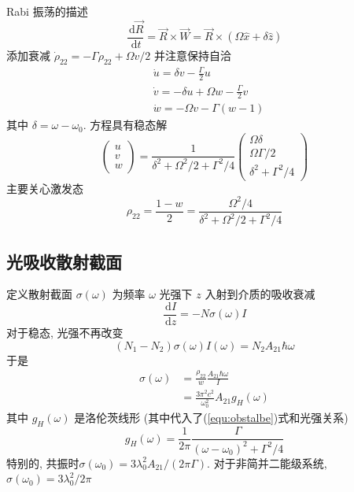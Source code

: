 \documentclass[10pt,a4paper,twocolumn]{article} %
\numberwithin{equation}{section} %
\newcommand{\dif}{\,\mathrm d}
\begin{document}
Rabi 振荡的描述
\begin{equation}
	\frac{\dif\vec R}{\dif t} = \vec R\times\vec W = \vec R\times
	(\Omega\hat x + \delta\hat z)
\end{equation}
添加衰减 $\dot\rho_{22} = -\Gamma\rho_{22} + \Omega v/2$ 并注意保持自洽
\begin{align}
	&\dot u = \delta v - \frac{\Gamma}{2}u \\
	&\dot v = -\delta u + \Omega w - \frac{\Gamma}{2}v \\
	&\dot w = -\Omega v - \Gamma(w - 1)
\end{align}
其中 $\delta = \omega - \omega_0$. 方程具有稳态解
\begin{equation}
	\begin{pmatrix}
		u \\ v \\ w
	\end{pmatrix} = \frac{1}{\delta^2+\Omega^2/2+\Gamma^2/4}
	\begin{pmatrix}
		\Omega\delta \\ \Omega\Gamma/2 \\ \delta^2 + \Gamma^2/4
	\end{pmatrix}
\end{equation}
主要关心激发态
\begin{equation}\label{equ:obstalbe}
	\rho_{22} = \frac{1-w}2 
	= \frac{\Omega^2/4}{\delta^2 + \Omega^2/2 + \Gamma^2/4}
\end{equation}
\subsection{光吸收散射截面} %
\label{sub:optical_abosrption_cross_section}
定义散射截面 $\sigma(\omega)$ 为频率 $\omega$ 光强下 $z$ 入射到介质的吸收衰减
\begin{equation}
	\frac{\dif I}{\dif z} = - N\sigma(\omega) I
\end{equation}
对于稳态, 光强不再改变
\begin{equation}
	(N_1 - N_2)\sigma(\omega) I(\omega) = N_2 A_{21}\hbar\omega
\end{equation}
于是
\begin{align}
	\sigma(\omega) &= \frac{\rho_{22}}{w}\frac{A_{21}\hbar\omega}{I}\\
	& = \frac{3\pi^2c^2}{\omega_0^2} A_{21} g_H(\omega)
\end{align}
其中 $g_H(\omega) $ 是洛伦茨线形 (其中代入了(\ref{equ:obstalbe})式和光强关系)
\begin{equation}
	g_H(\omega) = \frac 1{2\pi}\frac{\Gamma}{(\omega - \omega_0)^2 + \Gamma^2/4}
\end{equation}
特别的, 共振时$\sigma(\omega_0) = 3\lambda_0^2A_{21}/(2\pi\Gamma)$. 
对于非简并二能级系统, $\sigma(\omega_0) = 3\lambda_0^2/2\pi$
\end{document}
